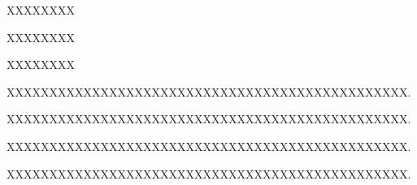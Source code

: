 \begin{resume}


  
  



  XXXXXXXX
  
  XXXXXXXX
  
  XXXXXXXX


  \begin{enumerate}[{[}1{]}]
    \item XXXXXXXXXXXXXXXXXXXXXXXXXXXXXXXXXXXXXXXXXXXXXXX.
    \item XXXXXXXXXXXXXXXXXXXXXXXXXXXXXXXXXXXXXXXXXXXXXXX.
    \item XXXXXXXXXXXXXXXXXXXXXXXXXXXXXXXXXXXXXXXXXXXXXXX.
    \item XXXXXXXXXXXXXXXXXXXXXXXXXXXXXXXXXXXXXXXXXXXXXXX.
  \end{enumerate}

\end{resume}
